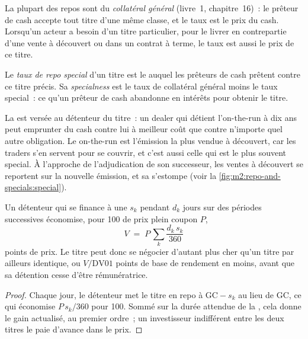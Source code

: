 La plupart des repos sont du \emph{collatéral général} (livre~1, chapitre~16)~: le prêteur de cash
accepte tout titre d'une même classe, et le taux est le prix du cash.
Lorsqu'un acteur a besoin d'un titre particulier, pour le livrer en contrepartie d'une vente à découvert
ou dans un contrat à terme, le taux est aussi le prix de ce titre.

\begin{definition}\label{def:m2:repo-and-specials:special}
Le \emph{taux de repo special} d'un titre est le
 auquel les prêteurs de cash prêtent contre ce titre précis. Sa
\emph{specialness} est le taux de collatéral général moins le
taux special~: ce qu'un prêteur de cash abandonne en intérêts pour obtenir le titre.
\end{definition}

La  est versée au détenteur du titre~: un dealer qui détient
l'on-the-run à dix ans peut emprunter du cash contre lui à meilleur coût que contre n'importe quel
autre obligation. Le on-the-run est l'émission la plus vendue à découvert, car les traders
s'en servent pour se couvrir, et c'est aussi celle qui est le plus souvent special. À l'approche
de l'adjudication de son successeur, les ventes à découvert se reportent sur la nouvelle émission, et sa  s'estompe
(voir la \cref{fig:m2:repo-and-specials:special}).

\begin{proposition}\label{prop:m2:repo-and-specials:value}
Un détenteur qui se finance à une  $s_k$ pendant $d_k$ jours sur des périodes
successives économise, pour 100 de prix plein coupon $P$,
\[
V \;=\; P\,\sum_k \frac{d_k\,s_k}{360}
\]
points de prix. Le titre peut donc se négocier d'autant plus cher qu'un titre par ailleurs
identique, ou $V/\mathrm{DV01}$ points de base de rendement en moins,
avant que sa détention cesse d'être rémunératrice.
\end{proposition}
\begin{proof}
Chaque jour, le détenteur met le titre en repo à $\mathrm{GC} - s_k$ au lieu de GC,
ce qui économise $P\,s_k/360$ pour 100. Sommé sur la durée attendue de la , cela donne le
gain actualisé, au premier ordre~; un investisseur indifférent entre les deux
titres le paie d'avance dans le prix.
\end{proof}

